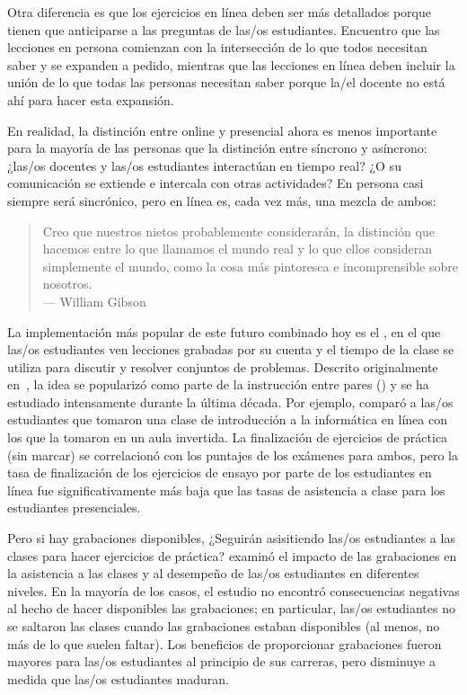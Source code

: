 Otra diferencia es que
los ejercicios en línea deben ser más detallados
porque tienen que anticiparse a las preguntas de las/os estudiantes.
Encuentro que las lecciones en persona comienzan con la intersección de lo que todos necesitan saber y se expanden a pedido,
mientras que las lecciones en línea deben incluir la unión de lo que todas las personas necesitan saber
porque la/el docente no está ahí para hacer esta expansión.

En realidad,
la distinción entre online y presencial ahora es menos importante para la mayoría de las personas
que la distinción entre síncrono y asíncrono:
¿las/os docentes y las/os estudiantes interactúan en tiempo real?
¿O su comunicación se extiende e intercala con otras actividades?
En persona casi siempre será sincrónico,
pero en línea es, cada vez más, una mezcla de ambos:

\begin{quote}

  Creo que nuestros nietos probablemente considerarán, la distinción que hacemos
  entre lo que llamamos el mundo real y lo que ellos consideran simplemente el mundo,
  como la cosa más pintoresca e incomprensible sobre nosotros. \\
  --- William Gibson

\end{quote}

La implementación más popular de este futuro combinado hoy
es el ,
en el que las/os estudiantes ven lecciones grabadas por su cuenta
y el tiempo de la clase se utiliza para discutir y resolver conjuntos de problemas.
Descrito originalmente en~\cite{King1993},
la idea se popularizó como parte de la instrucción entre pares ()
y se ha estudiado intensamente durante la última década.
Por ejemplo,
\cite{Camp2016} comparó a las/os estudiantes que tomaron una clase de introducción a la informática en línea
con los que la tomaron en un aula invertida.
La finalización de ejercicios de práctica (sin marcar) se correlacionó con los puntajes de los exámenes para ambos, 
pero la tasa de finalización de los ejercicios de ensayo por parte de los estudiantes en línea
fue significativamente más baja que las tasas de asistencia a clase para los estudiantes presenciales.

Pero si hay grabaciones disponibles,
¿Seguirán asisitiendo las/os estudiantes a las clases para hacer ejercicios de práctica?
\cite{Nord2017} examinó el impacto de las grabaciones en la asistencia a las clases
y al desempeño de las/os estudiantes en diferentes niveles.
En la mayoría de los casos, el estudio no encontró consecuencias negativas al hecho de hacer disponibles las grabaciones;
en particular,
las/os estudiantes no se saltaron las clases cuando las grabaciones estaban disponibles
(al menos, no más de lo que suelen faltar).
Los beneficios de proporcionar grabaciones fueron mayores para las/os estudiantes al principio de sus carreras,
pero disminuye a medida que las/os estudiantes maduran.

